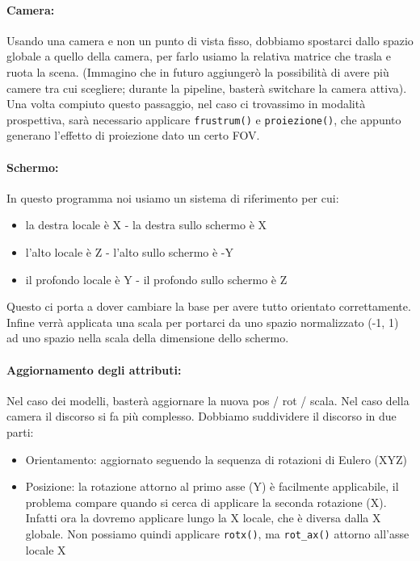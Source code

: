 \documentclass{article}
\begin{document}
\paragraph{Camera:} Usando una camera e non un punto di vista fisso, dobbiamo spostarci dallo spazio globale a quello della camera, per farlo usiamo la relativa matrice che trasla e ruota la scena. (Immagino che in futuro aggiungerò la possibilità di avere più camere tra cui scegliere; durante la pipeline, basterà switchare la camera attiva). Una volta compiuto questo passaggio, nel caso ci trovassimo in modalità prospettiva, sarà necessario applicare \texttt{frustrum()} e \texttt{proiezione()}, che appunto generano l'effetto di proiezione dato un certo FOV.

\paragraph{Schermo:} In questo programma noi usiamo un sistema di riferimento per cui:
\begin{itemize}
	\item la destra locale è X - la destra sullo schermo è X
	\item l'alto locale è Z - l'alto sullo schermo è -Y
	\item il profondo locale è Y - il profondo sullo schermo è Z
\end{itemize} 
%
Questo ci porta a dover cambiare la base per avere tutto orientato correttamente. Infine verrà applicata una scala per portarci da uno spazio normalizzato (-1, 1) ad uno spazio nella scala della dimensione dello schermo.

\paragraph{Aggiornamento degli attributi:} Nel caso dei modelli, basterà aggiornare la nuova pos / rot / scala.
Nel caso della camera il discorso si fa più complesso. Dobbiamo suddividere il discorso in due parti:
\begin{itemize}
	\item Orientamento: aggiornato seguendo la sequenza di rotazioni di Eulero (XYZ)
	\item Posizione: la rotazione attorno al primo asse (Y) è facilmente applicabile, il problema compare quando si cerca di applicare la seconda rotazione (X). Infatti ora la dovremo applicare lungo la X locale, che è diversa dalla X globale. Non possiamo quindi applicare \texttt{rotx()}, ma \texttt{rot\_ax()} attorno all'asse locale X
\end{itemize}
\end{document}
